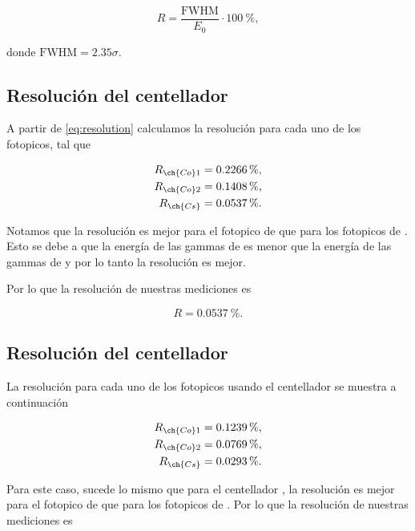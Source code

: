 \documentclass[12pt]{article}
\begin{document}
    \begin{equation}
        R = \dfrac{\text{FWHM}}{E_{0}} \cdot \qty{100}{\percent},
        \label{eq:resolution}
    \end{equation}

    donde \(\text{FWHM} = 2.35\sigma\).
    
    \subsection*{Resolución del centellador }

    A partir de \cref{eq:resolution} calculamos la resolución para cada uno de los fotopicos, tal que

    \begin{align*}
        R_{\ch{Co}1} &= \qty{0.2266}{\percent}, \\
        R_{\ch{Co}2} &= \qty{0.1408}{\percent}, \\
        R_{\ch{Cs}} &= \qty{0.0537}{\percent}.
    \end{align*}

    Notamos que la resolución es mejor para el fotopico de  que para los fotopicos de . Esto se debe a que la energía de las gammas de  es menor que la energía de las gammas de  y por lo tanto la resolución es mejor.

    Por lo que la resolución de nuestras mediciones es

    \begin{equation*}
        R = \qty{0.0537}{\percent}.
    \end{equation*}

    \subsection*{Resolución del centellador }

    La resolución para cada uno de los fotopicos usando el centellador  se muestra a continuación

    \begin{align*}
        R_{\ch{Co}1} &= \qty{0.1239}{\percent}, \\
        R_{\ch{Co}2} &= \qty{0.0769}{\percent}, \\
        R_{\ch{Cs}} &= \qty{0.0293}{\percent}.
    \end{align*}

    Para este caso, sucede lo mismo que para el centellador , la resolución es mejor para el fotopico de  que para los fotopicos de . Por lo que la resolución de nuestras mediciones es
\end{document}
